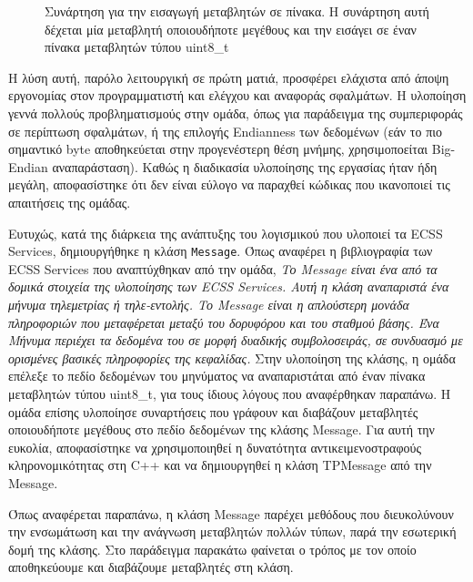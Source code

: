 \documentclass[a4paper,nobib,justified]{tufte-book}
\begin{document}
\begin{figure}
	\inputminted{cpp}{code/examples/stuffInVector.cpp}
	\label{code:stuffInVector}
	\caption[Συνάρτηση για την εισαγωγή μεταβλητών σε πίνακα]{Συνάρτηση για την εισαγωγή μεταβλητών σε πίνακα. Η συνάρτηση αυτή δέχεται μία μεταβλητή οποιουδήποτε μεγέθους και την εισάγει σε έναν πίνακα μεταβλητών τύπου uint8\_t}
\end{figure}

Η λύση αυτή, παρόλο λειτουργική σε πρώτη ματιά, προσφέρει ελάχιστα από άποψη εργονομίας στον προγραμματιστή και ελέγχου και αναφοράς σφαλμάτων. Η υλοποίηση γεννά πολλούς προβληματισμούς στην ομάδα, όπως για παράδειγμα της συμπεριφοράς σε περίπτωση σφαλμάτων, ή της επιλογής Endianness των δεδομένων (εάν το πιο σημαντικό byte αποθηκεύεται στην προγενέστερη θέση μνήμης, χρησιμοποείται Big-Endian αναπαράσταση). Καθώς η διαδικασία υλοποίησης της εργασίας ήταν ήδη μεγάλη, αποφασίστηκε ότι δεν είναι εύλογο να παραχθεί κώδικας που ικανοποιεί τις απαιτήσεις της ομάδας.

Ευτυχώς, κατά της διάρκεια της ανάπτυξης του λογισμικού που υλοποιεί τα ECSS Services, δημιουργήθηκε η κλάση \texttt{Message}. Όπως αναφέρει η βιβλιογραφία των ECSS Services που αναπτύχθηκαν από την ομάδα, \textit{Το Message είναι ένα από τα δομικά στοιχεία της υλοποίησης των ECSS Services. Αυτή η κλάση αναπαριστά ένα μήνυμα τηλεμετρίας ή τηλε-εντολής. Το Message είναι η απλούστερη μονάδα πληροφοριών που μεταφέρεται μεταξύ του δορυφόρου και του σταθμού βάσης. Ένα Μήνυμα περιέχει τα δεδομένα του σε μορφή δυαδικής συμβολοσειράς, σε συνδυασμό με ορισμένες βασικές πληροφορίες της κεφαλίδας.} Στην υλοποίηση της κλάσης, η ομάδα επέλεξε το πεδίο δεδομένων του μηνύματος να αναπαριστάται από έναν πίνακα μεταβλητών τύπου uint8\_t, για τους ίδιους λόγους που αναφέρθηκαν παραπάνω. Η ομάδα επίσης υλοποίησε συναρτήσεις που γράφουν και διαβάζουν μεταβλητές οποιουδήποτε μεγέθους στο πεδίο δεδομένων της κλάσης Message. Για αυτή την ευκολία, αποφασίστηκε να χρησιμοποιηθεί η δυνατότητα αντικειμενοστραφούς κληρονομικότητας στη C++ και να δημιουργηθεί η κλάση TPMessage από την Message.

Όπως αναφέρεται παραπάνω, η κλάση Message παρέχει μεθόδους που διευκολύνουν την ενσωμάτωση και την ανάγνωση μεταβλητών πολλών τύπων, παρά την εσωτερική δομή της κλάσης. Στο παράδειγμα παρακάτω φαίνεται ο τρόπος με τον οποίο αποθηκεύουμε και διαβάζουμε μεταβλητές στη κλάση.
\end{document}
